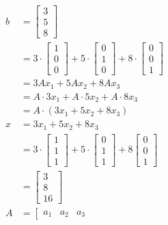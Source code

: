 \documentclass[main.tex]{subfiles}
\begin{document}
\begin{enumerate}
    $$
    \begin{aligned}
    b &= \left[\begin{array}{l}
    3 \\
    5 \\
    8
    \end{array}\right] \\
    & = 3 \cdot\left[\begin{array}{l}
    1 \\
    0 \\
    0
    \end{array}\right]+5 \cdot\left[\begin{array}{l}
    0 \\
    1 \\
    0
    \end{array}\right]+8 \cdot\left[\begin{array}{l}
    0 \\
    0 \\
    1
    \end{array}\right]\\
    & = 3 A x_{1}+5 A x_{2}+8 A x_{3} \\
    & = A \cdot 3 x_{1}+A \cdot 5 x_{2}+A \cdot 8 x_{3} \\
    & = A \cdot\left(3 x_{1}+5 x_{2}+8 x_{3}\right) \\
    x & = 3 x_{1}+5 x_{2}+8 x_{3} \\
    & = 3 \cdot\left[\begin{array}{l}
    1 \\
    1 \\
    1
    \end{array}\right]+5 \cdot\left[\begin{array}{l}
    0 \\
    1 \\
    1
    \end{array}\right]+8\left[\begin{array}{l}
    0 \\
    0 \\
    1
    \end{array}\right]\\
    & = \left[\begin{array}{c}
    3 \\
    8 \\
    16
    \end{array}\right] \\
    A & = \left[\begin{array}{lll}
    a_{1} & a_{2} & a_{3}

\end{array}
\end{aligned}$$
\end{enumerate}
\end{document}
